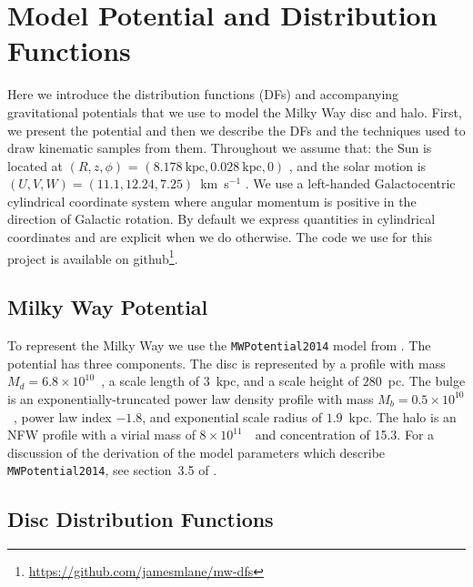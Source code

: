 \section{Model Potential and Distribution Functions}
\label{sec:ModelPotentialandDistributionFunctions}

Here we introduce the distribution functions (DFs) and accompanying gravitational potentials that we use to model the Milky Way disc and halo. First, we present the potential and then we describe the DFs and the techniques used to draw kinematic samples from them. Throughout we assume that: the Sun is located at $(R,z,\phi)$ = $(8.178~\text{kpc}, 0.028~\text{kpc}, 0)$ \parencite{gravity19,bennett19}, and the solar motion is $(U,V,W) = (11.1, 12.24, 7.25)$~km~s$^{-1}$ \parencite{schoenrich10}. We use a left-handed Galactocentric cylindrical coordinate system where angular momentum is positive in the direction of Galactic rotation. By default we express quantities in cylindrical coordinates and are explicit when we do otherwise. The code we use for this project is available on github\footnote{\url{https://github.com/jamesmlane/mw-dfs}}.

\subsection{Milky Way Potential}
\label{subsec:MilkWayPotential}

To represent the Milky Way we use the \texttt{MWPotential2014} model from \textcite{bovy15}. The potential has three components. The disc is represented by a \textcite{miyamoto75} profile with mass $M_{d} = 6.8\times10^{10}$~\Msun, a scale length of $3$~kpc, and a scale height of $280$~pc. The bulge is an exponentially-truncated power law density profile with mass $M_{b} = 0.5\times10^{10}$~\Msun, power law index $-1.8$, and exponential scale radius of $1.9$~kpc. The halo is an NFW \parencite{navarro97} profile with a virial mass of $8\times10^{11}$~\Msun\ and concentration of 15.3. For a discussion of the derivation of the model parameters which describe \texttt{MWPotential2014}, see section~3.5 of \textcite{bovy15}.

\subsection{Disc Distribution Functions}
\label{subsec:DiscDistributionFunctions}

